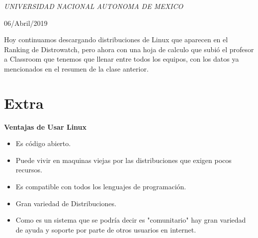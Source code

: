 \documentclass[a4paper, 11pt, oneside]{article}
\begin{document}
\begin{titlepage}
	\textit{UNIVERSIDAD NACIONAL AUTONOMA DE MEXICO} 
	
	\vfill
	
	
	
	
	\vspace{0.3\baselineskip} 
	
	06/Abril/2019 
	
	

\end{titlepage}
Hoy continuamos descargando distribuciones de Linux que aparecen en el Ranking de Distrowatch, pero ahora con una hoja de calculo que subió el profesor a Classroom que tenemos que llenar entre todos los equipos, con los datos ya mencionados en el resumen de la clase anterior.
\section*{Extra}
\textbf{Ventajas de Usar Linux}
\begin{itemize}
    \item Es código abierto.
    \item Puede vivir en maquinas viejas por las distribuciones que exigen pocos recursos.
    \item Es compatible con todos los lenguajes de programación.
    \item Gran variedad de Distribuciones.
    \item Como es un sistema que se podría decir es "comunitario" hay gran variedad de ayuda y soporte por parte de otros usuarios en internet.
\end{itemize}
\end{document}
